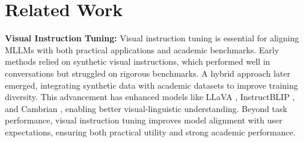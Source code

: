 \section{Related Work}
\textbf{Visual Instruction Tuning:}  
Visual instruction tuning is essential for aligning MLLMs with both practical applications and academic benchmarks. Early methods relied on synthetic visual instructions, which performed well in conversations but struggled on rigorous benchmarks. A hybrid approach later emerged, integrating synthetic data with academic datasets to improve training diversity. This advancement has enhanced models like LLaVA \citep{liu2024visual}, InstructBLIP \citep{dai2023instructblip}, and Cambrian \citep{tong2024cambrian}, enabling better visual-linguistic understanding. Beyond task performance, visual instruction tuning improves model alignment with user expectations, ensuring both practical utility and strong academic performance.

\noindent


